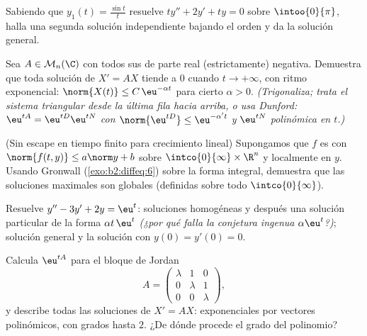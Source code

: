 \begin{exercise}[$\star\star$]\label{exo:b2:diffeq:7}
Sabiendo que $y_1(t) = \frac{\sin t}{t}$ resuelve $ty'' + 2y' + ty =
0$ sobre $\intoo{0}{\pi}$, halla una segunda solución independiente
bajando el orden y da la solución general.
\end{exercise}

\begin{exercise}[$\star\star\star$]\label{exo:b2:diffeq:8}
Sea $A \in \mathcal{M}_n(\C)$ con todos sus  de parte
real (estrictamente) negativa. Demuestra que toda solución de $X' =
AX$ tiende a $0$ cuando $t \to +\infty$, con ritmo exponencial:
$\norm{X(t)} \leq C\,\eu^{-\alpha t}$ para cierto $\alpha > 0$.
\emph{(Trigonaliza; trata el sistema triangular desde la última fila
hacia arriba, o usa Dunford: $\eu^{tA} = \eu^{tD}\eu^{tN}$ con
$\norm{\eu^{tD}} \leq \eu^{-\alpha' t}$ y $\eu^{tN}$ polinómica en
$t$.)}
\end{exercise}

\begin{exercise}[$\star\star\star$]\label{exo:b2:diffeq:9}
(Sin escape en tiempo finito para crecimiento lineal) Supongamos que
$f$ es  con $\norm{f(t, y)} \leq a\norm y + b$ sobre
$\intco{0}{\infty} \times \R^n$ y localmente  en $y$.
Usando Gronwall (\cref{exo:b2:diffeq:6}) sobre la forma integral,
demuestra que las soluciones maximales son globales (definidas sobre
todo $\intco{0}{\infty}$).
\end{exercise}

\begin{exercise}[$\star$]\label{exo:b2:diffeq:10}
Resuelve $y'' - 3y' + 2y = \eu^{t}$: soluciones homogéneas y después
una solución particular de la forma $\alpha t\,\eu^{t}$ \emph{(¿por
qué falla la conjetura ingenua $\alpha\eu^t$?)}; solución general y
la solución con $y(0) = y'(0) = 0$.
\end{exercise}

\begin{exercise}[$\star\star$]\label{exo:b2:diffeq:11}
Calcula $\eu^{tA}$ para el bloque de Jordan
\[
A = \begin{pmatrix} \lambda & 1 & 0\\ 0 & \lambda & 1\\
0 & 0 & \lambda\end{pmatrix},
\]
y describe todas las soluciones de $X' = AX$: exponenciales por
vectores polinómicos, con grados hasta $2$. ¿De dónde procede el
grado del polinomio?
\end{exercise}

